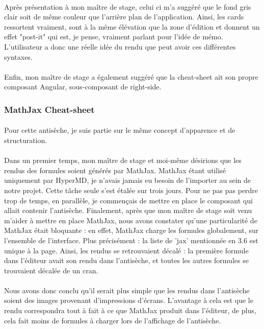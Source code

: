 \documentclass[12pt]{article}
\begin{document}
\paragraph{}
Après présentation à mon maître de stage, celui ci m'a suggéré que le fond gris clair soit de même couleur que l'arrière plan de l'application. Ainsi, les cards ressortent vraiment, sont à la même élévation que la zone d'édition et donnent un effet "post-it" qui est, je pense, vraiment parlant pour l'idée de mémo. L'utilisateur a donc une réelle idée du rendu que peut avoir ces différentes syntaxes.
\paragraph{}
Enfin, mon maître de stage a également suggéré que la cheat-sheet ait son propre composant Angular, sous-composant de right-side.\\

\subsubsection{MathJax Cheat-sheet}
\paragraph{}
Pour cette antisèche, je suis partie sur le même concept d'apparence et de structuration.
\paragraph{}
Dans un premier temps, mon maître de stage et moi-même désirions que les rendus des formules soient générés par MathJax. MathJax étant utilisé uniquement par HyperMD, je n'avais jamais eu besoin de l'importer au sein de notre projet. Cette tâche seule s'est étalée sur trois jours. Pour ne pas pas perdre trop de temps, en parallèle, je commençais de mettre en place le composant qui allait contenir l'antisèche. Finalement, après que mon maître de stage soit venu m'aider à mettre en place MathJax, nous avons constater qu'une particularité de MathJax était bloquante : en effet, MathJax charge les formules globalement, sur l'ensemble de l'interface. Plus précisément : la liste de 'jax' mentionnée en 3.6 est unique à la page. Ainsi, les rendus se retrouvaient décalé : la première formule dans l'éditeur avait son rendu dans l'antisèche, et toutes les autres formules se trouvaient décalée de un cran.
\paragraph{}
Nous avons donc conclu qu'il serait plus simple que les rendus dans l'antisèche soient des images provenant d'impressions d'écrans. L'avantage à cela est que le rendu correspondra tout à fait à ce que MathJax produit dans l'éditeur, de plus, cela fait moins de formules à charger lors de l'affichage de l'antisèche.\\
\end{document}
